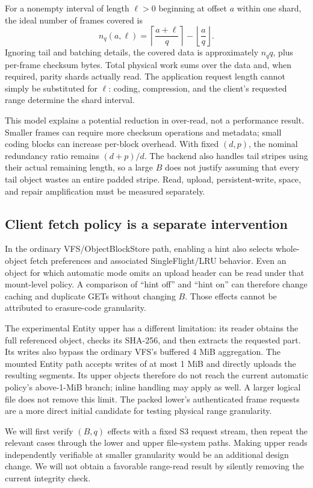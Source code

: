 For a nonempty interval of length $\ell>0$ beginning at offset $a$ within one shard,
the ideal number of frames covered is
\begin{equation}
n_q(a,\ell)=
\left\lceil\frac{a+\ell}{q}\right\rceil-
\left\lfloor\frac{a}{q}\right\rfloor.
\end{equation}
Ignoring tail and batching details, the covered data is approximately
$n_q q$, plus per-frame checksum bytes. Total physical work sums over the
data and, when required, parity shards actually read. The application
request length cannot simply be substituted for $\ell$: coding, compression,
and the client's requested range determine the shard interval.

This model explains a potential reduction in over-read, not a performance
result. Smaller frames can require more checksum operations and metadata;
small coding blocks can increase per-block overhead. With fixed $(d,p)$,
the nominal redundancy ratio remains $(d+p)/d$. The backend also handles
tail stripes using their actual remaining length, so a large $B$ does not
justify assuming that every tail object wastes an entire padded stripe.
Read, upload, persistent-write, space, and repair amplification must be
measured separately.

\subsection{Client fetch policy is a separate intervention}

In the ordinary VFS/ObjectBlockStore path, enabling a hint also selects
whole-object fetch preferences and associated SingleFlight/LRU behavior.
Even an object for which automatic mode omits an upload header can be read
under that mount-level policy. A comparison of ``hint off'' and ``hint on''
can therefore change caching and duplicate GETs without changing $B$.
Those effects cannot be attributed to erasure-code granularity.

The experimental Entity upper has a different limitation: its reader
obtains the full referenced object, checks its SHA-256, and then extracts
the requested part. Its writes also bypass the ordinary VFS's buffered
4 MiB aggregation. The mounted Entity path accepts writes of at most 1 MiB
and directly uploads the resulting segments. Its upper objects therefore
do not reach the current automatic policy's above-1-MiB branch; inline
handling may apply as well. A larger logical file does not remove this limit.
The packed lower's authenticated frame requests are a more direct initial
candidate for testing physical range granularity.

We will first verify $(B,q)$ effects with a fixed S3 request stream, then
repeat the relevant cases through the lower and upper file-system paths.
Making upper reads independently verifiable at smaller granularity would
be an additional design change. We will not obtain a favorable range-read
result by silently removing the current integrity check.
